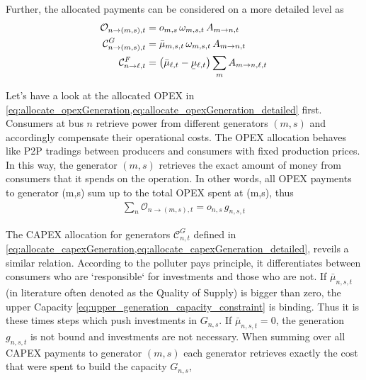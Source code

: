 \documentclass[11pt,twocolumn]{article}
\newcommand{\ubar}[1]{\underaccent{\bar}{#1}}
\newcommand{\generation}[1][n]{g_{#1,s,t}}
\newcommand{\generationshare}[1][n]{\omega_{#1,s,t}}
\newcommand{\capacityGeneration}{G_{n,s}}
\newcommand{\opexGeneration}[1][n]{o_{#1,s}}
\newcommand{\muuppergeneration}[1][n]{\bar{\mu}_{#1,s,t}}
\newcommand{\mulowerflow}{\ubar{\mu}_{\ell,t}}
\newcommand{\muupperflow}{\bar{\mu}_{\ell,t}}
\newcommand{\allocatePeer}[1][m \rightarrow n]{A_{#1,t}}
\newcommand{\allocateTransaction}[1][m \rightarrow n]{A_{#1,\ell,t}}
\newcommand{\allocateCapexGeneration}[1][n]{\mathcal{C}^{G}_{#1,t}}
\newcommand{\allocateCapexFlow}[1][n]{\mathcal{C}^{F}_{#1,t}}
\newcommand{\allocateOpex}[1][n]{\mathcal{O}_{#1,t}}
\begin{document}
Further, the allocated payments can be considered on a more detailed level as
\begin{align}
 \allocateOpex[n \rightarrow (m,s)] &= 
 \opexGeneration[m] \, \generationshare[m] \, \allocatePeer 
\label{eq:allocate_opexGeneration_detailed}\\
 \allocateCapexGeneration[n \rightarrow (m,s)] &= 
 \muuppergeneration[m] \, \generationshare[m] \, \allocatePeer
\label{eq:allocate_capexGeneration_detailed} \\
 \allocateCapexFlow[n \rightarrow \ell] &=  
  \left( \muupperflow - \mulowerflow\right) \sum_{m} \allocateTransaction  
\label{eq:allocate_capexFlow_detailed}
\end{align}
% 

Let's have a look at the allocated OPEX in \cref{eq:allocate_opexGeneration,eq:allocate_opexGeneration_detailed} first. Consumers at bus $n$ retrieve power from different generators $(m,s)$ and accordingly compensate their operational costs. The OPEX allocation behaves like P2P tradings between producers and consumers with fixed production prices. In this way, the generator $(m,s)$ retrieves the exact amount of money from consumers that it spends on the operation. In other words, all OPEX payments to generator (m,s) sum up to the total OPEX spent at (m,s), thus 
\begin{align}
\sum_{n} \allocateOpex[n \rightarrow (m,s)] = \opexGeneration \, \generation
\label{eq:no_profit_opex}
\end{align}


The CAPEX allocation for generators $\allocateCapexGeneration$ defined in \cref{eq:allocate_capexGeneration,eq:allocate_capexGeneration_detailed}, reveils a similar relation. According to the polluter pays principle, it differentiates between consumers who are `responsible` for investments and those who are not. If $\muuppergeneration$ (in literature often denoted as the Quality of Supply) is bigger than zero, the upper Capacity \cref{eq:upper_generation_capacity_constraint} is binding. Thus it is these times steps which push investments in $\capacityGeneration$. If $\muuppergeneration = 0$, the generation $\generation$ is not bound and investments are not necessary. 
When summing over all CAPEX payments to generator $(m,s)$ each generator retrieves exactly the cost that were spent to build the capacity $\capacityGeneration$,
\end{document}
